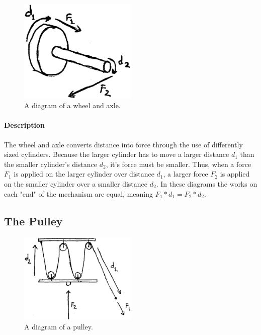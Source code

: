 \documentclass[12pt]{article}
\begin{document}
	\begin{figure}[H]
		\centerline{\includegraphics[width=0.5\textwidth]{images/wheel.EPS}}
		\caption{A diagram of a wheel and axle.}
	\end{figure}

	\paragraph{Description}
	The wheel and axle converts distance into force through the use of differently sized cylinders. Because the larger cylinder has to move a larger distance $d_1$ than the smaller cylinder's distance $d_2$, it's force must be smaller. Thus, when a force $F_1$ is applied on the larger cylinder over distance $d_1$, a larger force $F_2$ is applied on the smaller cylinder over a smaller distance $d_2$. In these diagrams the works on each "end" of the mechanism are equal, meaning $F_1 * d_1 = F_2 * d_2$. 
			
	\subsection{The Pulley}
	
	\begin{figure}[H]
		\centerline{\includegraphics[width=0.5\textwidth]{images/pulley.EPS}}
		\caption{A diagram of a pulley.}
	\end{figure}
\end{document}

